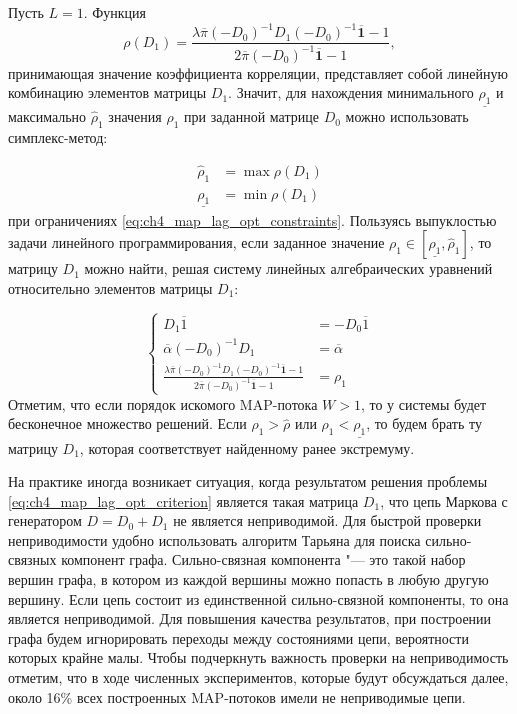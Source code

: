 Пусть $L = 1$. Функция
$$
\rho(D_1) = \frac{\lambda \overline{\pi} (-D_0)^{-1} D_1 (-D_0)^{-1} \overline{\mathbf{1}} - 1}{2 \overline{\pi} (-D_0)^{-1} \overline{\mathbf{1}} - 1},
$$
принимающая значение коэффициента корреляции, представляет собой линейную комбинацию элементов матрицы $D_1$. Значит, для нахождения минимального $\underline{\rho_1}$ и максимально $\hat{\rho}_1$ значения $\rho_1$ при заданной матрице $D_0$ можно использовать симплекс-метод:

\begin{equation}
    \label{eq:ch4_approx_map_rho_boundaries}
    \begin{aligned}
        \hat{\rho}_1 &= \max \rho(D_1)\\
        \underline{\rho_1} &= \min \rho(D_1)
    \end{aligned}
\end{equation}
при ограничениях \eqref{eq:ch4_map_lag_opt_constraints}. Пользуясь выпуклостью задачи линейного программирования, если заданное значение $\rho_1 \in [\underline{\rho_1}, \hat{\rho}_1]$, то матрицу $D_1$ можно найти, решая систему линейных алгебраических уравнений относительно элементов матрицы $D_1$:

\begin{equation}
    \label{eq:ch4_map_lag_opt_ales}
    \begin{cases}
        D_1 \overline{1} &= -D_0 \overline{1}\\
        \overline{\alpha} (-D_0)^{-1} D_1 &= \overline{\alpha}\\
        \frac{\lambda \overline{\pi} (-D_0)^{-1} D_1 (-D_0)^{-1} \overline{\mathbf{1}} - 1}{2 \overline{\pi} (-D_0)^{-1} \overline{\mathbf{1}} - 1} &= \rho_1
    \end{cases}
\end{equation}
Отметим, что если порядок искомого MAP-потока $W > 1$, то у системы будет бесконечное множество решений. Если $\rho_1 > \hat{\rho}$ или $\rho_1 < \underline{\rho_1}$, то будем брать ту матрицу $D_1$, которая соответствует найденному ранее экстремуму.

На практике иногда возникает ситуация, когда результатом решения проблемы \eqref{eq:ch4_map_lag_opt_criterion} является такая матрица $D_1$, что цепь Маркова с генератором $D = D_0 + D_1$ не является неприводимой. Для быстрой проверки неприводимости удобно использовать алгоритм Тарьяна \cite{tarjan72} для поиска сильно-связных компонент графа. Сильно-связная компонента "--- это такой набор вершин графа, в котором из каждой вершины можно попасть в любую другую вершину. Если цепь состоит из единственной сильно-связной компоненты, то она является неприводимой. Для повышения качества результатов, при построении графа будем игнорировать переходы между состояниями цепи, вероятности которых крайне малы. Чтобы подчеркнуть важность проверки на неприводимость отметим, что в ходе численных экспериментов, которые будут обсуждаться далее, около 16\% всех построенных MAP-потоков имели не неприводимые цепи.

